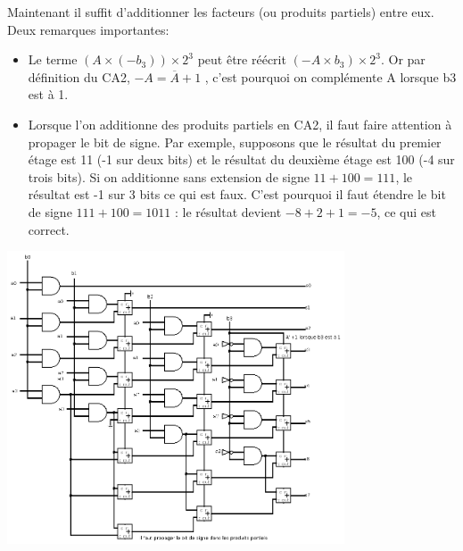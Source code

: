 \documentclass[a4paper,10pt]{exam}
\begin{document}
\begin{enumerate}
\begin{solution}
      Maintenant il suffit d'additionner les facteurs (ou produits partiels) entre eux.
      \\Deux remarques importantes:
      \begin{itemize}
        \item Le terme $(A \times (-b_3)) \times 2^3$ peut être réécrit $(-A \times b_3) \times 2^3$.
	  Or par définition du CA2, $-A = \overline{A} + 1$	, c'est pourquoi on complémente 
	  A lorsque b3 est à 1.
	\item Lorsque l'on additionne des produits partiels en CA2, il faut faire 
	  attention à propager le bit de signe. Par exemple, supposons que le résultat 
	  du premier étage est 11 (-1 sur deux bits) et le résultat du deuxième étage 
	  est 100 (-4 sur trois bits). Si on additionne sans extension de signe 
	  $11 + 100 = 111$, le résultat est -1 sur 3 bits ce qui est faux.
	  C'est pourquoi il faut étendre le bit de signe $111 + 100 = 1011$ : le
	  résultat devient $-8 + 2 + 1 = -5$, ce qui est correct.
      \end{itemize}

      \includegraphics[width=10cm]{4-mult-CA-2}
      
    \end{solution}

\end{enumerate}
\end{document}
